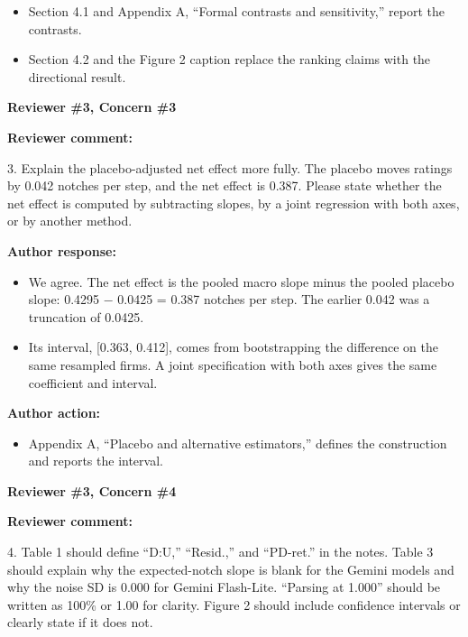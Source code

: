 \documentclass[11pt]{article}
\newcommand{\rvcomment}[1]{{\color{ReviewerGreen}#1}}
\newcommand{\concern}[1]{\textbf{\color{ReviewerGreen}#1}}
\begin{document}
\begin{itemize}

\item Section 4.1 and Appendix A, ``Formal contrasts and sensitivity,'' report the contrasts.

\item Section 4.2 and the Figure 2 caption replace the ranking claims with the directional result.

\end{itemize}

\vspace{12pt}
\concern{Reviewer \#3, Concern \#3}

\concern{Reviewer comment:}

\rvcomment{3. Explain the placebo-adjusted net effect more fully. The placebo moves ratings by 0.042 notches per step, and the net effect is 0.387. Please state whether the net effect is computed by subtracting slopes, by a joint regression with both axes, or by another method.}

\textbf{Author response:}

\begin{itemize}

\item We agree. The net effect is the pooled macro slope minus the pooled placebo slope: 0.4295 $-$ 0.0425 = 0.387 notches per step. The earlier 0.042 was a truncation of 0.0425.

\item Its interval, [0.363, 0.412], comes from bootstrapping the difference on the same resampled firms. A joint specification with both axes gives the same coefficient and interval.

\end{itemize}

\textbf{Author action:}

\begin{itemize}

\item Appendix A, ``Placebo and alternative estimators,'' defines the construction and reports the interval.

\end{itemize}

\vspace{12pt}
\concern{Reviewer \#3, Concern \#4}

\concern{Reviewer comment:}

\rvcomment{4. Table 1 should define ``D:U,'' ``Resid.,'' and ``PD-ret.'' in the notes. Table 3 should explain why the expected-notch slope is blank for the Gemini models and why the noise SD is 0.000 for Gemini Flash-Lite. ``Parsing at 1.000'' should be written as 100\% or 1.00 for clarity. Figure 2 should include confidence intervals or clearly state if it does not.}
\end{document}
